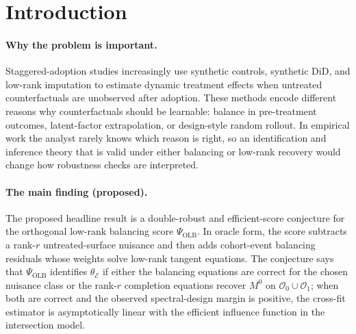 \documentclass[11pt]{article}
\theoremstyle{definition}
\theoremstyle{plain}
\theoremstyle{remark}
\begin{document}
\section{Introduction}
\paragraph{Why the problem is important.}
Staggered-adoption studies increasingly use synthetic controls, synthetic DiD, and low-rank imputation to estimate dynamic treatment effects when untreated counterfactuals are unobserved after adoption.  These methods encode different reasons why counterfactuals should be learnable: balance in pre-treatment outcomes, latent-factor extrapolation, or design-style random rollout.  In empirical work the analyst rarely knows which reason is right, so an identification and inference theory that is valid under either balancing or low-rank recovery would change how robustness checks are interpreted.

\paragraph{The main finding (proposed).}
The proposed headline result is a double-robust and efficient-score conjecture for the orthogonal low-rank balancing score \(\Psi_{\mathrm{OLB}}\).  In oracle form, the score subtracts a rank-\(r\) untreated-surface nuisance and then adds cohort-event balancing residuals whose weights solve low-rank tangent equations.  The conjecture says that \(\Psi_{\mathrm{OLB}}\) identifies \(\theta_{\mathcal{E}}\) if either the balancing equations are correct for the chosen nuisance class or the rank-\(r\) completion equations recover \(M^0\) on \(\mathcal{O}_0\cup\mathcal{O}_1\); when both are correct and the observed spectral-design margin is positive, the cross-fit estimator is asymptotically linear with the efficient influence function in the intersection model.
\end{document}
